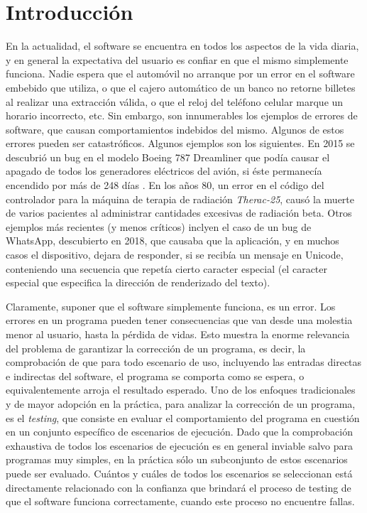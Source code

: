 \chapter{Introducci\'on}
\label{cap:introduccion}

En la actualidad, el software se encuentra en todos los aspectos de la vida diaria, y en general la expectativa del usuario es confiar en que el mismo simplemente funciona. Nadie espera que el autom\'ovil no arranque por un error en el software embebido que utiliza, o que el cajero autom\'atico de un banco no retorne billetes al realizar una extracci\'on v\'alida, o que el reloj del tel\'efono celular marque un horario incorrecto, etc. Sin embargo, son innumerables los ejemplos de errores de software, que causan comportamientos indebidos del mismo. Algunos de estos errores pueden ser catastr\'oficos. Algunos ejemplos son los siguientes. En 2015 se descubri\'o un bug en el modelo Boeing 787 Dreamliner que pod\'ia causar el apagado de todos los generadores el\'ectricos del avi\'on, si \'este permanec\'ia encendido por m\'as de 248 d\'ias \cite{bibliography.bugs.boeing}. En los a\~nos 80, un error en el c\'odigo del controlador para la m\'aquina de terapia de radiaci\'on \emph{Therac-25}, caus\'o la muerte de varios pacientes al administrar cantidades excesivas de radiaci\'on beta. Otros ejemplos m\'as recientes (y menos cr\'iticos) inclyen el caso de un bug de WhatsApp, descubierto en 2018, que causaba que la aplicaci\'on, y en muchos casos el dispositivo, dejara de responder, si se recib\'ia un mensaje en Unicode, conteniendo una secuencia que repet\'ia cierto caracter especial (el caracter especial que especifica la direcci\'on de renderizado del texto).

Claramente, suponer que el software simplemente funciona, es un error. Los errores en un programa pueden tener consecuencias que van desde una molestia menor al usuario, hasta la p\'erdida de vidas. Esto muestra la enorme relevancia del problema de garantizar la correcci\'on de un programa, es decir, la comprobaci\'on de que para todo escenario de uso, incluyendo las entradas directas e indirectas del software, el programa se comporta como se espera, o equivalentemente arroja el resultado esperado. Uno de los enfoques tradicionales y de mayor adopci\'on en la pr\'actica, para analizar la correcci\'on de un programa, es el \emph{testing}, que consiste en evaluar el comportamiento del programa en cuesti\'on en un conjunto espec\'ifico de escenarios de ejecuci\'on. Dado que la comprobaci\'on exhaustiva de todos los escenarios de ejecuci\'on es en general inviable salvo para programas muy simples, en la pr\'actica s\'olo un subconjunto de estos escenarios puede ser evaluado. Cu\'antos y cu\'ales de todos los escenarios se seleccionan est\'a directamente relacionado con la confianza que brindar\'a el proceso de testing de que el software funciona correctamente, cuando este proceso no encuentre fallas.

